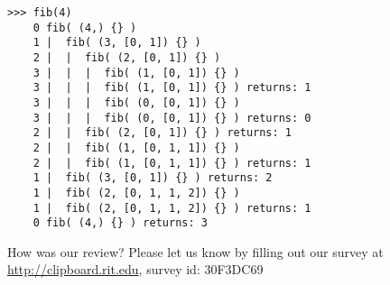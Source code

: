 \documentclass[11pt]{article}
\newenvironment{answer}{\large\lstset{basicstyle=\large}\color{white}}{}
\newenvironment{answer}{\large\lstset{basicstyle=\large}\color{red}}{}
\begin{document}
\begin{enumerate}
    \begin{answer}
    
\begin{verbatim}
>>> fib(4)
    0 fib( (4,) {} )
    1 |  fib( (3, [0, 1]) {} )
    2 |  |  fib( (2, [0, 1]) {} )
    3 |  |  |  fib( (1, [0, 1]) {} )
    3 |  |  |  fib( (1, [0, 1]) {} ) returns: 1
    3 |  |  |  fib( (0, [0, 1]) {} )
    3 |  |  |  fib( (0, [0, 1]) {} ) returns: 0
    2 |  |  fib( (2, [0, 1]) {} ) returns: 1
    2 |  |  fib( (1, [0, 1, 1]) {} )
    2 |  |  fib( (1, [0, 1, 1]) {} ) returns: 1
    1 |  fib( (3, [0, 1]) {} ) returns: 2
    1 |  fib( (2, [0, 1, 1, 2]) {} )
    1 |  fib( (2, [0, 1, 1, 2]) {} ) returns: 1
    0 fib( (4,) {} ) returns: 3
\end{verbatim}
    \end{answer}

\end{enumerate}

\vfill
\begin{framed}
How was our review? Please let us know by filling out our survey at\\
\url{http://clipboard.rit.edu}, survey id: 30F3DC69
\end{framed}
\end{document}
